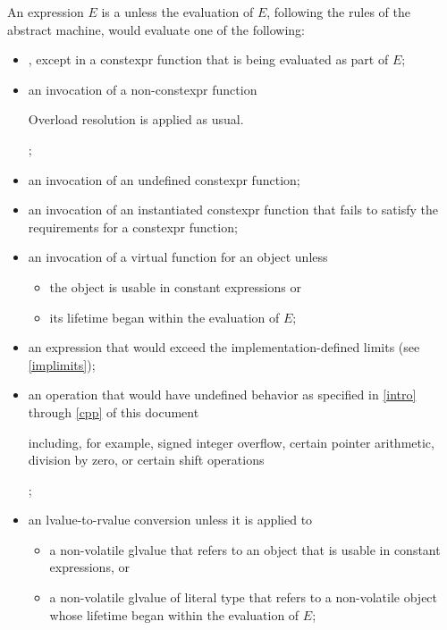 \pnum
An expression $E$ is a 
unless the evaluation of $E$, following the rules of the abstract
machine, would evaluate one of the following:
\begin{itemize}
\item
{}, except in a constexpr
function that is being evaluated as part
of $E$;

\item
an invocation of a non-constexpr function
\begin{note}
Overload resolution
is applied as usual.
\end{note}%
;

\item
an invocation of an undefined constexpr function;

\item
an invocation of an instantiated constexpr function
that fails to satisfy the requirements
for a constexpr function;

\item
an invocation of a virtual function
for an object unless
  \begin{itemize}
  \item the object is usable in constant expressions or
  \item its lifetime began within the evaluation of $E$;
  \end{itemize}

\item
an expression that would exceed the implementation-defined
limits (see \ref{implimits});

\item
an operation that would have undefined behavior
as specified in \ref{intro} through \ref{cpp}
of this document
\begin{note}
including,
for example, signed integer overflow, certain
pointer arithmetic, division by
zero, or certain shift operations
\end{note}%
;

\item
an lvalue-to-rvalue conversion unless
it is applied to
\begin{itemize}
  \item
  a non-volatile glvalue that refers to an object that is
  usable in constant expressions, or

  \item
  a non-volatile glvalue of literal type that refers to a non-volatile object
  whose lifetime began within the evaluation of $E$;
\end{itemize}


\end{itemize}
